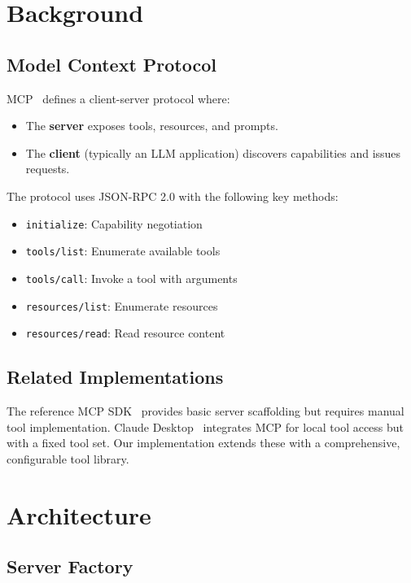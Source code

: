 \documentclass[11pt,twocolumn]{article}
\begin{document}
\section{Background}

\subsection{Model Context Protocol}

MCP~\cite{mcp2022} defines a client-server protocol where:
\begin{itemize}
    \item The \textbf{server} exposes tools, resources, and prompts.
    \item The \textbf{client} (typically an LLM application) discovers capabilities and issues requests.
\end{itemize}

The protocol uses JSON-RPC 2.0 with the following key methods:
\begin{itemize}
    \item \texttt{initialize}: Capability negotiation
    \item \texttt{tools/list}: Enumerate available tools
    \item \texttt{tools/call}: Invoke a tool with arguments
    \item \texttt{resources/list}: Enumerate resources
    \item \texttt{resources/read}: Read resource content
\end{itemize}

\subsection{Related Implementations}

The reference MCP SDK~\cite{mcpsdk2022} provides basic server scaffolding but requires manual tool implementation. Claude Desktop~\cite{claude2023} integrates MCP for local tool access but with a fixed tool set. Our implementation extends these with a comprehensive, configurable tool library.

\section{Architecture}

\subsection{Server Factory}
\end{document}
